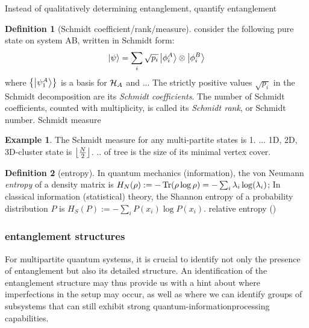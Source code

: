 \documentclass[
10pt,
aps,
pra,
linenumbers,
floatfix,
]{revtex4-2}
\theoremstyle{plain}
\theoremstyle{definition}
\newtheorem{definition}{Definition}
\newtheorem{example}{Example}
\newtheorem{remark}{Remark}
\newcommand{\dm}{\rho}
\begin{document}
Instead of qualitatively determining entanglement, quantify entanglement
\begin{definition}[Schmidt coefficient/rank/measure]
	consider the following pure state on system AB, written in Schmidt form:
	\begin{equation}
		\ket{\psi} = \sum_i \sqrt{p_i} \ket{\phi_i^A}\otimes\ket{\phi_i^B}
	\end{equation}
	where $\qty{\ket{\psi_1^A}}$ is a basis for $\mathcal{H}_A$ and ...
	The strictly positive values $\sqrt{p_i}$ in the Schmidt decomposition are its \emph{Schmidt coefficients}. 
	The number of Schmidt coefficients, counted with multiplicity, is called its \emph{Schmidt rank}, or Schmidt number.
	Schmidt measure
\end{definition}
\begin{example}
	The Schmidt measure for any multi-partite  states is 1.
	... 1D, 2D, 3D-cluster state is $\left\lfloor \frac{N}{2} \right\rfloor$.
	.. of tree is the size of its minimal vertex cover.
\end{example}
\begin{definition}[entropy]\label{def:entropy}
	In quantum mechanics (information), the von Neumann \emph{entropy} of a density matrix is $H_N(\dm): = -\Tr(\dm \log \dm)=-\sum_i\lambda_i\log(\lambda_i)$;
	In classical information (statistical) theory, the Shannon entropy of a probability distribution $P$ is  $H_S(P):= -\sum_i P(x_i) \log P(x_i)$.
	relative entropy ()
\end{definition}

\subsubsection{entanglement structures}
For multipartite quantum systems, it is crucial to identify not only the presence of entanglement but also its detailed structure.
An identification of the entanglement structure may thus provide us with a hint about where imperfections in the setup may occur, as well as where we can identify groups of subsystems that can still exhibit strong quantum-informationprocessing capabilities.
\end{document}
